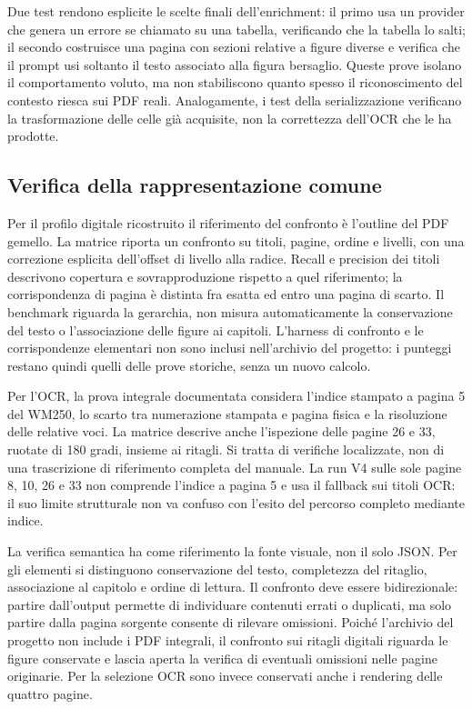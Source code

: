 Due test rendono esplicite le scelte finali dell'enrichment: il primo usa un provider che genera un errore se chiamato su una tabella, verificando che la tabella lo salti; il secondo costruisce una pagina con sezioni relative a figure diverse e verifica che il prompt usi soltanto il testo associato alla figura bersaglio. Queste prove isolano il comportamento voluto, ma non stabiliscono quanto spesso il riconoscimento del contesto riesca sui PDF reali. Analogamente, i test della serializzazione verificano la trasformazione delle celle già acquisite, non la correttezza dell'OCR che le ha prodotte.

\subsection{Verifica della rappresentazione comune}

Per il profilo digitale ricostruito il riferimento del confronto è l'outline del PDF gemello. La matrice riporta un confronto su titoli, pagine, ordine e livelli, con una correzione esplicita dell'offset di livello alla radice. Recall e precision dei titoli descrivono copertura e sovrapproduzione rispetto a quel riferimento; la corrispondenza di pagina è distinta fra esatta ed entro una pagina di scarto. Il benchmark riguarda la gerarchia, non misura automaticamente la conservazione del testo o l'associazione delle figure ai capitoli. L'harness di confronto e le corrispondenze elementari non sono inclusi nell'archivio del progetto: i punteggi restano quindi quelli delle prove storiche, senza un nuovo calcolo.

Per l'OCR, la prova integrale documentata considera l'indice stampato a pagina 5 del WM250, lo scarto tra numerazione stampata e pagina fisica e la risoluzione delle relative voci. La matrice descrive anche l'ispezione delle pagine 26 e 33, ruotate di 180 gradi, insieme ai ritagli. Si tratta di verifiche localizzate, non di una trascrizione di riferimento completa del manuale. La run V4 sulle sole pagine 8, 10, 26 e 33 non comprende l'indice a pagina 5 e usa il fallback sui titoli OCR: il suo limite strutturale non va confuso con l'esito del percorso completo mediante indice.

La verifica semantica ha come riferimento la fonte visuale, non il solo JSON. Per gli elementi si distinguono conservazione del testo, completezza del ritaglio, associazione al capitolo e ordine di lettura. Il confronto deve essere bidirezionale: partire dall'output permette di individuare contenuti errati o duplicati, ma solo partire dalla pagina sorgente consente di rilevare omissioni. Poiché l'archivio del progetto non include i PDF integrali, il confronto sui ritagli digitali riguarda le figure conservate e lascia aperta la verifica di eventuali omissioni nelle pagine originarie. Per la selezione OCR sono invece conservati anche i rendering delle quattro pagine.

